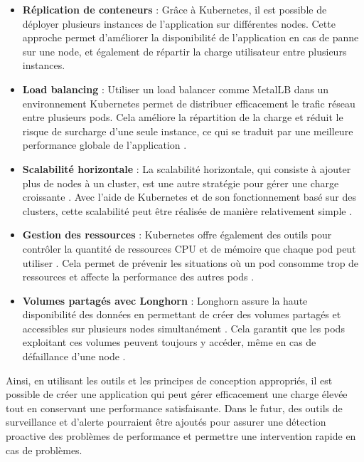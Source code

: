 \begin{itemize}
    \item \textbf{Réplication de conteneurs} : Grâce à Kubernetes, il est possible de déployer plusieurs instances de l'application sur différentes nodes.
    Cette approche permet d'améliorer la disponibilité de l'application en cas de panne sur une node, et également de répartir la charge utilisateur entre plusieurs instances.\\

    \item \textbf{Load balancing} : Utiliser un load balancer comme MetalLB dans un environnement Kubernetes permet de distribuer efficacement le trafic réseau entre plusieurs pods.
    Cela améliore la répartition de la charge et réduit le risque de surcharge d'une seule instance, ce qui se traduit par une meilleure performance globale de l'application .\\

    \item \textbf{Scalabilité horizontale} : La scalabilité horizontale, qui consiste à ajouter plus de nodes à un cluster, est une autre stratégie pour gérer une charge croissante .
    Avec l'aide de Kubernetes et de son fonctionnement basé sur des clusters, cette scalabilité peut être réalisée de manière relativement simple .\\

    \item \textbf{Gestion des ressources} : Kubernetes offre également des outils pour contrôler la quantité de ressources CPU et de mémoire que chaque pod peut utiliser .
    Cela permet de prévenir les situations où un pod consomme trop de ressources et affecte la performance des autres pods .\\

    \item \textbf{Volumes partagés avec Longhorn} : Longhorn assure la haute disponibilité des données en permettant de créer des volumes partagés et accessibles sur plusieurs nodes simultanément .
    Cela garantit que les pods exploitant ces volumes peuvent toujours y accéder, même en cas de défaillance d'une node .\\
\end{itemize}

Ainsi, en utilisant les outils et les principes de conception appropriés, il est possible de créer une application qui peut gérer efficacement une charge élevée tout en conservant une performance satisfaisante.
Dans le futur, des outils de surveillance et d'alerte pourraient être ajoutés pour assurer une détection proactive des problèmes de performance et permettre une intervention rapide en cas de problèmes.